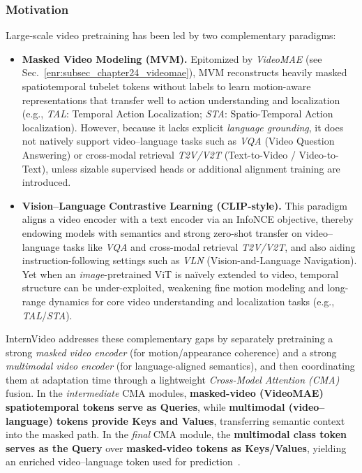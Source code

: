 \begin{enrichment}
\begin{enrichment}
        \newpage
        
        \subsubsection{Motivation}
        \label{subsubsec_chapter24_internvideo_motivation}
        Large-scale video pretraining has been led by two complementary paradigms:
        
        \begin{itemize}
            \item \textbf{Masked Video Modeling (MVM).} Epitomized by \emph{VideoMAE} (see Sec.~\ref{enr:subsec_chapter24_videomae}), MVM reconstructs heavily masked spatiotemporal tubelet tokens without labels to learn motion-aware representations that transfer well to action understanding and localization (e.g., \emph{TAL}: Temporal Action Localization; \emph{STA}: Spatio-Temporal Action localization). However, because it lacks explicit \emph{language grounding}, it does not natively support video–language tasks such as \emph{VQA} (Video Question Answering) or cross-modal retrieval \emph{T2V/V2T} (Text-to-Video / Video-to-Text), unless sizable supervised heads or additional alignment training are introduced. 
            \item \textbf{Vision--Language Contrastive Learning (CLIP-style).} This paradigm aligns a video encoder with a text encoder via an InfoNCE objective, thereby endowing models with semantics and strong zero-shot transfer on video–language tasks like \emph{VQA} and cross-modal retrieval \emph{T2V/V2T}, and also aiding instruction-following settings such as \emph{VLN} (Vision-and-Language Navigation). Yet when an \emph{image}-pretrained ViT is naïvely extended to video, temporal structure can be under-exploited, weakening fine motion modeling and long-range dynamics for core video understanding and localization tasks (e.g., \emph{TAL}/\emph{STA}). 
        \end{itemize}
        
        \noindent
        InternVideo addresses these complementary gaps by separately pretraining a strong \emph{masked video encoder} (for motion/appearance coherence) and a strong \emph{multimodal video encoder} (for language-aligned semantics), and then coordinating them at adaptation time through a lightweight \emph{Cross-Model Attention (CMA)} fusion. In the \emph{intermediate} CMA modules, \textbf{masked-video (VideoMAE) spatiotemporal tokens serve as Queries}, while \textbf{multimodal (video–language) tokens provide Keys and Values}, transferring semantic context into the masked path. In the \emph{final} CMA module, the \textbf{multimodal class token serves as the Query} over \textbf{masked-video tokens as Keys/Values}, yielding an enriched video–language token used for prediction~\cite{wang2022_internvideo}.
        

\end{enrichment}
\end{enrichment}
